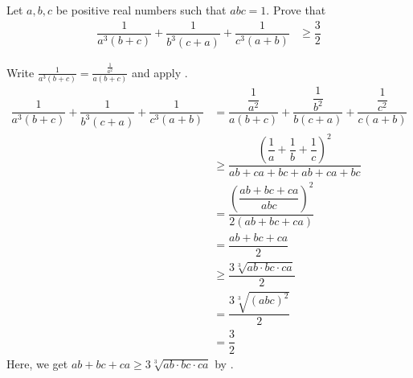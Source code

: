 \documentclass{subfile}
\begin{document}
		\begin{problem}
			Let $a,b,c$ be positive real numbers such that $abc=1$. Prove that
				\begin{align*}
					\dfrac{1}{a^{3}(b+c)}+\dfrac{1}{b^{3}(c+a)}+\dfrac{1}{c^{3}(a+b)}
						& \geq \dfrac{3}{2}
				\end{align*}

				\begin{solution}
					Write $\frac{1}{a^{3}(b+c)}=\frac{\frac{1}{a^{2}}}{a(b+c)}$ and apply .
						\begin{align*}
							\dfrac{1}{a^{3}(b+c)}+\dfrac{1}{b^{3}(c+a)}+\dfrac{1}{c^{3}(a+b)}
								& = \dfrac{\dfrac{1}{a^{2}}}{a(b+c)}+\dfrac{\dfrac{1}{b^{2}}}{b(c+a)}+\dfrac{\dfrac{1}{c^{2}}}{c(a+b)}\\
								& \geq \dfrac{\left(\dfrac{1}{a}+\dfrac{1}{b}+\dfrac{1}{c}\right)^{2}}{ab+ca+bc+ab+ca+bc}\\
								& = \dfrac{\left(\dfrac{ab+bc+ca}{abc}\right)^{2}}{2(ab+bc+ca)}\\
								& = \dfrac{ab+bc+ca}{2}\\
								& \geq \dfrac{3\sqrt[3]{ab\cdot bc\cdot ca}}{2}\\
								& = \dfrac{3\sqrt[3]{(abc)^{2}}}{2}\\
								& = \dfrac{3}{2}
						\end{align*}
					Here, we get $ab+bc+ca\geq3\sqrt[3]{ab\cdot bc\cdot ca}$ by .
				\end{solution}
		\end{problem}
\end{document}
